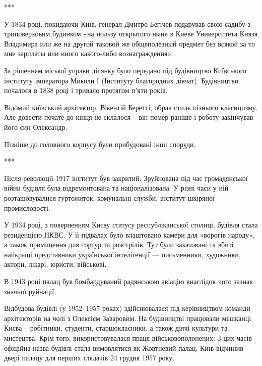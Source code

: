 ***

У 1834 році, покидаючи Київ, генерал Дмитро Бегічев подарував свою садибу з
триповерховим будинком «на пользу открытого ныне в Киеве Университета Князя
Владимира или же на другой таковой же общеполезный предмет без всякой за то мне
зарплаты или иного какого-либо вознаграждения». 

За рішенням міської управи ділянку було передано під будівництво Київського
інституту імператора Миколи I (Інституту благородних дівчат). Будівництво
почалося в 1838 році і тривало протягом п'яти років.


Відомий київський архітектор, Вікентій Беретті, обрав стиль пізнього
класицизму. Але довести почате до кінця не склалося – він помер раніше і роботу
закінчував його син Олександр. 


Пізніше до головного корпусу були прибудовані інші споруди.

***

Після революції 1917 інститут був закритий. Зруйнована під час громадянської
війни будівля була відремонтована та націоналізована. У різні часи у ній
розташовувалися гуртожиток, комунальні служби, інститут шкіряної промисловості. 

У 1934 році, з поверненням Києву статусу республіканської столиці, будівля
стала резиденцією НКВС. У її підвалах було влаштовано камери для «ворогів
народу», а також приміщення для тортур та розстрілів. Тут були закатовані та
вбиті найкращі представники української інтелігенції — письменники, художники,
актори, лікарі, юристи, військові. 

\begin{multicols}{2} %
\setlength{\parindent}{0pt}

\columnbreak
{}

\end{multicols} %

В 1943 році палац був бомбардуваний радянською авіацію внаслідок чого зазнав
значної руйнації.

Відбудова будівлі (у 1952–1957 роках) здійснювалася під керівництвом команди
архітекторів на чолі з  Олексієм Заваровим. На будівництві працювали мешканці
Києва – робітники, студенти, старшокласники, а також діячі культури та
мистецтва. Крім того, використовувалася праця військовополонених. З цих часів
офіційна назва будівлі стала вимовлятися як Жовтневий палац. Київ відчинив
двері палацу для перших глядачів 24 грудня 1957 року.


